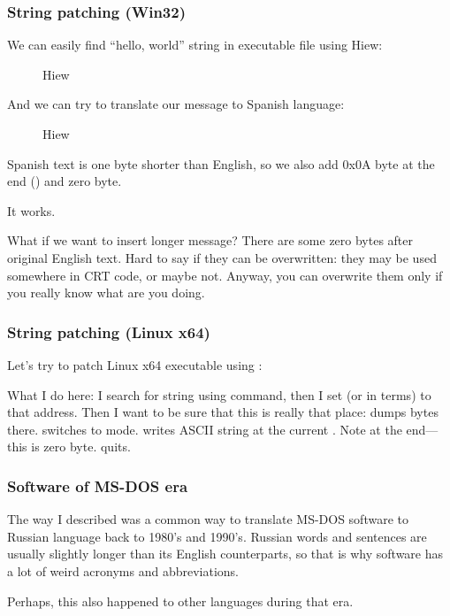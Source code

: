 \subsubsection{String patching (Win32)}

We can easily find ``hello, world'' string in executable file using Hiew:

\begin{figure}[H]
\centering
{}
\caption{Hiew}
\label{}
\end{figure}

And we can try to translate our message to Spanish language:

\begin{figure}[H]
\centering
{}
\caption{Hiew}
\label{}
\end{figure}

Spanish text is one byte shorter than English, so we also add 0x0A byte at the end () and zero byte.

It works.

What if we want to insert longer message?
There are some zero bytes after original English text.
Hard to say if they can be overwritten: they may be used somewhere in \ac{CRT} code, or maybe not.
Anyway, you can overwrite them only if you really know what are you doing.

\subsubsection{String patching (Linux x64)}

\myindex{\radare}
Let's try to patch Linux x64 executable using \radare:



What I do here: I search for  string using \TT{/} command, 
then I set  (or  in \radare terms) to that address.
Then I want to be sure that this is really that place:  dumps bytes there.
 switches \radare to  mode.
 writes ASCII string at the current .
Note  at the end---this is zero byte.
 quits.

\subsubsection{Software  of MS-DOS era}

The way I described was a common way to translate MS-DOS software to Russian language back to 1980's and 1990's.
Russian words and sentences are usually slightly longer than its English counterparts, so that is why 
software has a lot of weird acronyms and abbreviations.

Perhaps, this also happened to other languages during that era.

